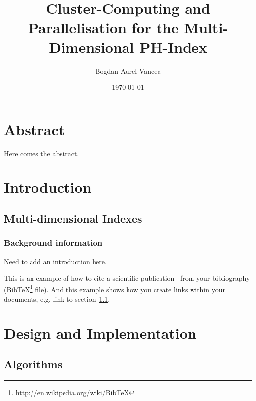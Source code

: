 \documentclass[11pt,a4paper]{globis-book}
\title{Cluster-Computing and Parallelisation for the
Multi-Dimensional PH-Index}
\author{Bogdan Aurel Vancea}
\institute{Institute of Information Systems}
\date{\today}
\begin{document}
\frontmatter
\maketitlepage
\cleardoublepage
{}

\chapter*{Abstract}

Here comes the abstract.

\tableofcontents

\mainmatter


\chapter{Introduction}
\section{Multi-dimensional Indexes}
\label{sec:title}

\subsection{Background information}
Need to add an introduction here.

This is an example of how to cite a scientific publication~\cite{murolo2013} from your bibliography (BibTeX\footnote{\url{http://en.wikipedia.org/wiki/BibTeX}} file). And this example shows how you create links within your documents, e.g. link to section~\ref{sec:title}.

\chapter{Design and Implementation}
\section{Algorithms}
\end{document}
